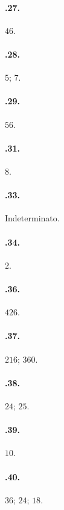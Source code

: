 \begin{multicols}{2}
\paragraph{\thechapter.27.}
$46$.

\paragraph{\thechapter.28.}
$5$; $7$.

\paragraph{\thechapter.29.}
$56$.

\paragraph{\thechapter.31.}
$8$.

\paragraph{\thechapter.33.}
Indeterminato.

\paragraph{\thechapter.34.}
$2$.

\paragraph{\thechapter.36.}
$426$.

\paragraph{\thechapter.37.}
$216$; $360$.

\paragraph{\thechapter.38.}
$24$; $25$.

\paragraph{\thechapter.39.}
$10$.

\paragraph{\thechapter.40.}
$36$; $24$; $18$.


\end{multicols}
